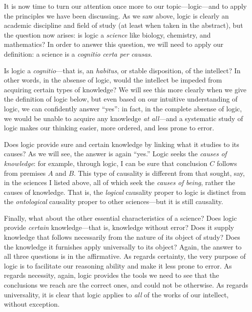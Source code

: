 \documentclass[
  12pt,
]{memoir}
\begin{document}
It is now time to turn our attention once more to our
topic---logic---and to apply the principles we have been discussing. As
we saw above, logic is clearly an academic discipline and field of study
(at least when taken in the abstract), but the question now arises: is
logic a \emph{science} like biology, chemistry, and mathematics? In
order to answer this question, we will need to apply our definition: a
science is a \emph{cognitio certa per causas}.

Is logic a \emph{cognitio}---that is, an \emph{habitus}, or stable
disposition, of the intellect? In other words, in the absense of logic,
would the intellect be impeded from acquiring certain types of
knowledge? We will see this more clearly when we give the definition of
logic below, but even based on our intuitive understanding of logic, we
can confidently answer ``yes'': in fact, in the complete absense of
logic, we would be unable to acquire any knowledge \emph{at all}---and a
systematic study of logic makes our thinking easier, more ordered, and
less prone to error.

Does logic provide sure and certain knowledge by linking what it studies
to its causes? As we will see, the answer is again ``yes.'' Logic seeks
the \emph{causes of knowledge}: for example, through logic, I can be
sure that conclusion \(C\) follows from premises \(A\) and \(B\). This
type of causality is different from that sought, say, in the sciences I
listed above, all of which seek the \emph{causes of being}, rather the
causes of knowledge. That is, the \emph{logical} causality proper to
logic is distinct from the \emph{ontological} causality proper to other
sciences---but it is still causality.

Finally, what about the other essential characteristics of a science?
Does logic provide \emph{certain} knowledge---that is, knowledge without
error? Does it supply knowledge that follows necessarily from the nature
of its object of study? Does the knowledge it furnishes apply
universally to its object? Again, the answer to all three questions is
in the affirmative. As regards certainty, the very purpose of logic is
to facilitate our reasoning ability and make it less prone to error. As
regards necessity, again, logic provides the tools we need to see that
the conclusions we reach are the correct ones, and could not be
otherwise. As regards universality, it is clear that logic applies to
\emph{all} of the works of our intellect, without exception.
\end{document}
